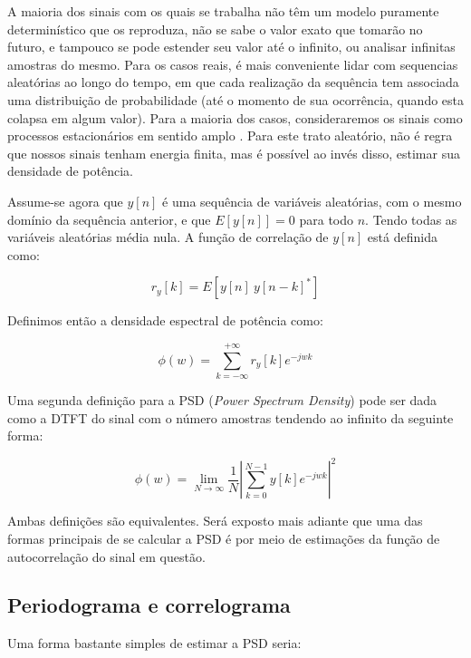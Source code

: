 A maioria dos sinais com os quais se trabalha não têm um modelo puramente determinístico que os reproduza, não se sabe o valor exato que tomarão no futuro, e tampouco se pode estender seu valor até o infinito, ou analisar infinitas amostras do mesmo. Para os casos reais, é mais conveniente lidar com sequencias aleatórias ao longo do tempo, em que cada realização da sequência tem associada uma distribuição de probabilidade (até o momento de sua ocorrência, quando esta colapsa em algum valor). Para a maioria dos casos, consideraremos os sinais como processos estacionários em sentido amplo \cite{haykin2005adaptive}. Para este trato aleatório, não é regra que nossos sinais tenham energia finita, mas é possível ao invés disso, estimar sua densidade de potência.

\indent Assume-se agora que $y[n]$ é uma sequência de variáveis aleatórias, com o mesmo domínio da sequência anterior, e que $E[y[n]]=0$ para todo $n$. Tendo todas as variáveis aleatórias média nula. A função de correlação de $y[n]$ está definida como:

\begin{equation}
r_y[k]=E[ y[n] \: y[n-k]^*]
\end{equation}

\indent Definimos então a densidade espectral de potência como:

\begin{equation}
\phi (w)=\sum_{k=-\infty}^{+\infty}r_y[k]e^{-jwk}
\end{equation}

\indent Uma segunda definição para a PSD (\textit{Power Spectrum Density}) pode ser dada como a DTFT do sinal com o número amostras tendendo ao infinito da seguinte forma:

\begin{equation}
\phi(w)=\lim_{N\rightarrow \infty}\frac{1}{N}\left|\sum_{k=0}^{N-1}y[k]e^{-jwk}  \right|^2
\end{equation}

\indent Ambas definições são equivalentes. Será exposto mais adiante que uma das formas principais de se calcular a PSD é por meio de estimações da função de autocorrelação do sinal em questão.


\subsection{Periodograma e correlograma}

Uma forma bastante simples de estimar a PSD seria:

